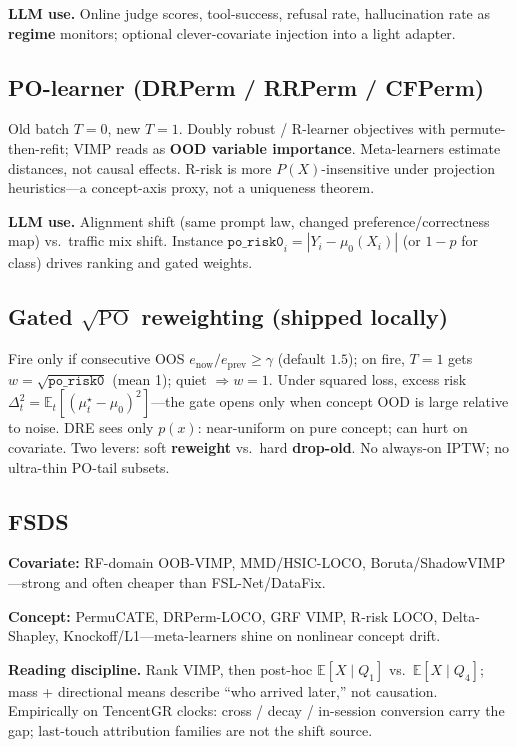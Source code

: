 \documentclass[11pt,a4paper]{article}
\begin{document}
\textbf{LLM use.} Online judge scores, tool-success, refusal rate, hallucination rate as \textbf{regime} monitors; optional clever-covariate injection into a light adapter.

\subsection{PO-learner (DRPerm / RRPerm / CFPerm)}
Old batch \(T=0\), new \(T=1\). Doubly robust / R-learner objectives with permute-then-refit; VIMP reads as \textbf{OOD variable importance}. Meta-learners estimate distances, not causal effects. R-risk is more \(P(X)\)-insensitive under projection heuristics---a concept-axis proxy, not a uniqueness theorem.

\textbf{LLM use.} Alignment shift (same prompt law, changed preference/correctness map) vs.\ traffic mix shift. Instance \(\texttt{po\_risk0}_i=|Y_i-\mu_0(X_i)|\) (or \(1-p\) for class) drives ranking and gated weights.

\subsection{Gated \(\sqrt{\mathrm{PO}}\) reweighting (shipped locally)}
Fire only if consecutive OOS \(e_{\mathrm{now}}/e_{\mathrm{prev}}\ge\gamma\) (default \(1.5\)); on fire, \(T=1\) gets \(w=\sqrt{\texttt{po\_risk0}}\) (mean 1); quiet \(\Rightarrow w=1\). Under squared loss, excess risk \(\Delta_t^2=\mathbb{E}_t[(\mu_t^\star-\mu_0)^2]\)---the gate opens only when concept OOD is large relative to noise. DRE sees only \(p(x)\): near-uniform on pure concept; can hurt on covariate. Two levers: soft \textbf{reweight} vs.\ hard \textbf{drop-old}. No always-on IPTW; no ultra-thin PO-tail subsets.

\subsection{FSDS}
\textbf{Covariate:} RF-domain OOB-VIMP, MMD/HSIC-LOCO, Boruta/ShadowVIMP---strong and often cheaper than FSL-Net/DataFix.

\textbf{Concept:} PermuCATE, DRPerm-LOCO, GRF VIMP, R-risk LOCO, Delta-Shapley, Knockoff/L1---meta-learners shine on nonlinear concept drift.

\textbf{Reading discipline.} Rank VIMP, then post-hoc \(\mathbb{E}[X\mid Q_1]\) vs.\ \(\mathbb{E}[X\mid Q_4]\); mass + directional means describe ``who arrived later,'' not causation. Empirically on TencentGR clocks: cross / decay / in-session conversion carry the gap; last-touch attribution families are not the shift source.
\end{document}
